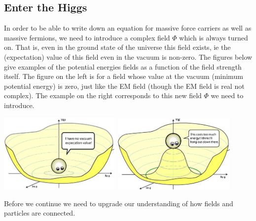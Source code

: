 \subsection{Enter the Higgs}
In order to be able to write down an equation for massive force carriers as well as massive fermions, we need to introduce a complex field $\Phi$ which is always turned on. That is, even in the ground state of the universe this field exists, ie the (expectation) value of this field even in the vacuum is non-zero. 
The figures below give examples of the potential energies fields as a function of the field strength itself. The figure on the left is for a field whose value at the vacuum (minimum potential energy) is zero, just like the EM field (though the EM field is real not complex). The example on the right corresponds to this new field $\Phi$ we need to introduce.
\begin{center}
\includegraphics[width=0.45\textwidth]{fig/higgs/phi_stable.JPG}
\includegraphics[width=0.45\textwidth]{fig/higgs/phi_unstable.JPG}
\end{center}

Before we continue we need to upgrade our understanding of how fields and particles are connected.
